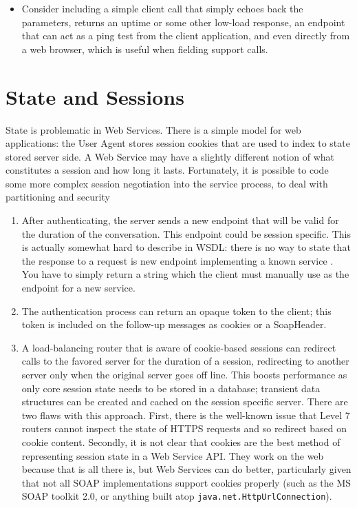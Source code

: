 \documentclass[draft]{report}
\begin{document}
\begin{itemize}
\item Consider including a simple client call that simply echoes back
the parameters, returns an uptime or some other low-load response, an
endpoint that can act as a ping test from the client application, and
even directly from a web browser, which is useful when fielding support
calls.

\end{itemize}

\section{State and Sessions}

State is problematic in Web Services. There is a simple model for web
applications: the User Agent stores session cookies that are used to
index to state stored server side. A Web Service may have a slightly
different notion of what constitutes a session and how long it lasts.
Fortunately, it is possible to code some more complex session
negotiation into the service process, to deal with partitioning and
security \begin{enumerate} \item

After authenticating, the server sends a new endpoint that will be valid
for the duration of the conversation. This endpoint could be session
specific. This is actually somewhat hard to describe in WSDL: there is
no way to state that the response to a request is new endpoint
implementing a known service \cite{spec:WSDL1.1}. You have to simply
return a string which the client must manually use as the endpoint for a
new service.

\item

The authentication process can return an opaque token to the client;
this token is included on the follow-up messages as cookies or a
SoapHeader.

\item

A load-balancing router that is aware of cookie-based sessions can
redirect calls to the favored server for the duration of a session,
redirecting to another server only when the original server goes off
line. This boosts performance as only core session state needs to be
stored in a database; transient data structures can be created and
cached on the session specific server. There are two flaws with this
approach. First, there is the well-known issue that Level 7 routers
cannot inspect the state of HTTPS requests and so redirect based on
cookie content. Secondly, it is not clear that cookies are the best
method of representing session state in a Web Service API. They work on
the web because that is all there is, but Web Services can do better,
particularly given that not all SOAP implementations support cookies
properly (such as the MS SOAP toolkit 2.0, or anything built atop
\verb$java.net.HttpUrlConnection$).

\end{enumerate}
\end{document}
